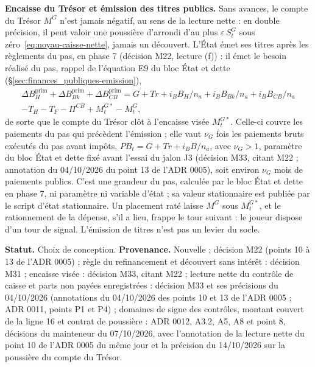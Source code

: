\documentclass[11pt,a4paper]{article}
\begin{document}
\begin{proposee}
\textbf{Encaisse du Trésor et émission des titres publics.} Sans avances, le compte du Trésor $M^G$ n'est jamais négatif, au sens de la lecture nette : en double précision, il peut valoir une poussière d'arrondi d'au plus $\varepsilon\,S^G_t$ sous zéro~\eqref{eq:noyau-caisse-nette}, jamais un découvert. L'État émet ses titres après les règlements du pas, en phase 7 (décision M22, lecture (f)) : il émet le besoin réalisé du pas, rappel de l'équation E9 du bloc État et dette (\S\ref{sec:finances_publiques-emission}),
\begin{multline*}
\Delta B_H^{\mathrm{prim}} + \Delta B_{\mathit{Bk}}^{\mathrm{prim}} + \Delta B_{\mathit{CB}}^{\mathrm{prim}} = G + \mathit{Tr} + i_B B_H/n_a + i_B B_{\mathit{Bk}}/n_a + i_B B_{\mathit{CB}}/n_a\\
- T_H - T_F - \Pi^{\mathit{CB}} + M^{G*}_t - M^G_t ,
\end{multline*}
de sorte que le compte du Trésor clôt à l'encaisse visée $M^{G*}_t$. Celle-ci couvre les paiements du pas qui précèdent l'émission ; elle vaut $\nu_G$ fois les paiements bruts exécutés du pas avant impôts, $\mathit{PB}_t = G + \mathit{Tr} + i_B B/n_a$, avec $\nu_G > 1$, paramètre du bloc État et dette fixé avant l'essai du jalon J3 (décision M33, citant M22 ; annotation du 04/10/2026 du point 13 de l'ADR 0005), soit environ $\nu_G$ mois de paiements publics. C'est une grandeur du pas, calculée par le bloc État et dette en phase 7, ni paramètre ni variable d'état ; sa valeur stationnaire est publiée par le script d'état stationnaire. Un placement raté laisse $M^G$ sous $M^{G*}_t$, et le rationnement de la dépense, s'il a lieu, frappe le tour suivant : le joueur dispose d'un tour de signal. L'émission de titres n'est pas un levier du socle.
\end{proposee}

\textbf{Statut.} Choix de conception. \textbf{Provenance.} Nouvelle ; décision M22 (points 10 à 13 de l'ADR 0005) ; règle du refinancement et découvert sans intérêt : décision M31 ; encaisse visée : décision M33, citant M22 ; lecture nette du contrôle de caisse et parts non payées enregistrées : décision M33 et ses précisions du 04/10/2026 (annotations du 04/10/2026 des points 10 et 13 de l'ADR 0005 ; ADR 0011, points P1 et P4) ; domaines de signe des contrôles, montant couvert de la ligne 16 et contrat de poussière : ADR 0012, A3.2, A5, A8 et point 8, décisions du mainteneur du 07/10/2026, avec l'annotation de la lecture nette du point 10 de l'ADR 0005 du même jour et la précision du 14/10/2026 sur la poussière du compte du Trésor.
\end{document}
